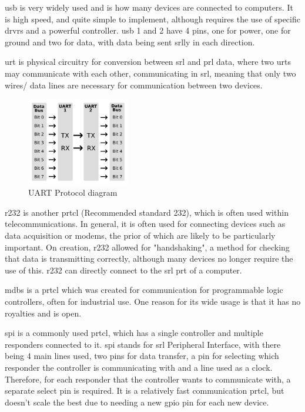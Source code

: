 \documentclass[a4paper,11pt]{report}
\begin{document}
\gls{usb} is very widely used and is how many devices are connected to computers. It is high speed, and quite simple to implement, although requires the use of specific \gls{drvr}s and a powerful controller. \gls{usb} 1 and 2 have 4 pins, one for power, one for ground and two for data, with data being sent \gls{srl}ly in each direction.

\gls{urt} is physical circuitry for conversion between \gls{srl} and \gls{prl} data, where two \gls{urt}s may communicate with each other, communicating in \gls{srl}, meaning that only two wires/ data lines are necessary for communication between two devices.

\begin{figure}[H]
\centering
\includegraphics[width=0.4\textwidth]{UART}
\caption{UART Protocol diagram}
\end{figure}

\gls{r232} is another \gls{prtcl} (Recommended standard 232), which is often used within telecommunications. In general, it is often used for connecting devices such as data acquisition or modems, the prior of which are likely to be particularly important. On creation, \gls{r232} allowed for "handshaking", a method for checking that data is transmitting correctly, although many devices no longer require the use of this. \gls{r232} can directly connect to the \gls{srl} \gls{prt} of a computer.

\gls{mdbs} is a \gls{prtcl} which was created for communication for programmable logic controllers, often for industrial use. One reason for its wide usage is that it has no royalties and is open.

\gls{spi} is a commonly used \gls{prtcl}, which has a single controller and multiple responders connected to it. \gls{spi} stands for \gls{srl} Peripheral Interface, with there being 4 main lines used, two pins for data transfer, a pin for selecting which responder the controller is communicating with and a line used as a clock. Therefore, for each responder that the controller wants to communicate with, a separate select pin is required. It is a relatively fast communication \gls{prtcl}, but doesn't scale the best due to needing a new \gls{gpio} pin for each new device.
\end{document}
